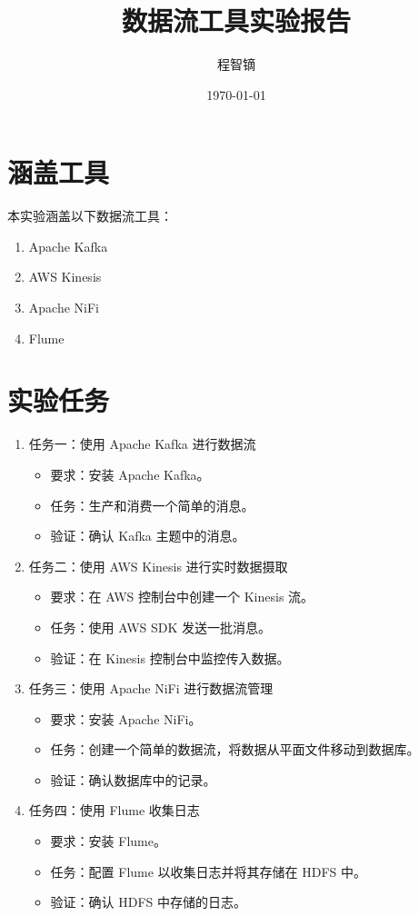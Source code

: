 \documentclass{article}
\title{数据流工具实验报告}
\author{程智镝}
\date{\today}
\begin{document}
\maketitle

\section*{涵盖工具}

本实验涵盖以下数据流工具：

\begin{enumerate}
    \item Apache Kafka
    \item AWS Kinesis
    \item Apache NiFi
    \item Flume
\end{enumerate}

\section*{实验任务}
\begin{enumerate}

    \item 任务一：使用 Apache Kafka 进行数据流
      \begin{itemize}
        \item 要求：安装 Apache Kafka。
        \item 任务：生产和消费一个简单的消息。
        \item 验证：确认 Kafka 主题中的消息。
      \end{itemize}
      
    \item 任务二：使用 AWS Kinesis 进行实时数据摄取
      \begin{itemize}
        \item 要求：在 AWS 控制台中创建一个 Kinesis 流。
        \item 任务：使用 AWS SDK 发送一批消息。
        \item 验证：在 Kinesis 控制台中监控传入数据。
      \end{itemize}
      
    \item 任务三：使用 Apache NiFi 进行数据流管理
      \begin{itemize}
        \item 要求：安装 Apache NiFi。
        \item 任务：创建一个简单的数据流，将数据从平面文件移动到数据库。
        \item 验证：确认数据库中的记录。
      \end{itemize}
      
    \item 任务四：使用 Flume 收集日志
      \begin{itemize}
        \item 要求：安装 Flume。
        \item 任务：配置 Flume 以收集日志并将其存储在 HDFS 中。
        \item 验证：确认 HDFS 中存储的日志。
      \end{itemize}

\end{enumerate}
\end{document}
